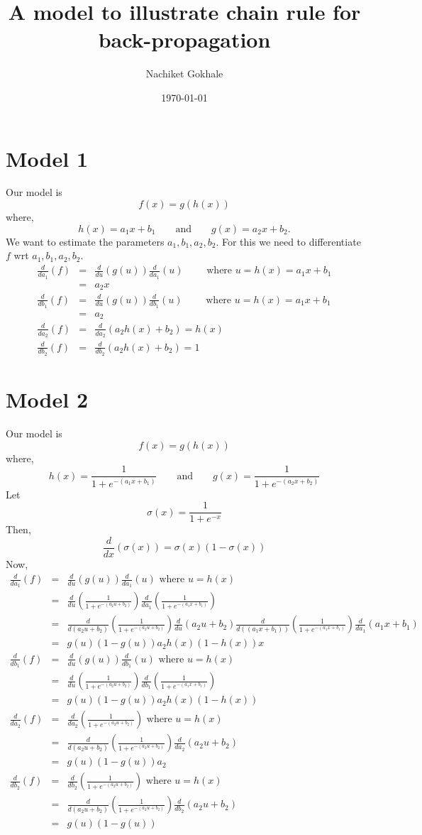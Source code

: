 \documentclass{article}
\newcommand{\beq}{\begin{equation}}
\newcommand{\eeq}{\end{equation}}
\newcommand{\ber}{\begin{eqnarray}}
\newcommand{\eer}{\end{eqnarray}}
\newcommand{\nn}{\nonumber}
\newcommand{\dd}[2]{\frac{d}{d{#2}}{(#1)} }
\begin{document}
\title{A model to illustrate chain rule for back-propagation}
\author{Nachiket Gokhale}
\date{\today}
\maketitle
\section{Model 1}
Our model is 
\beq
f(x) = g(h(x))
\eeq
where,
\beq
h(x) = a_1x + b_1 \qquad \text{and} \qquad g(x) = a_2x+b_2.
\eeq
We want to estimate the parameters $a_1,b_1,a_2,b_2$. For this we need to differentiate $f$ wrt $a_1,b_1,a_2,b_2$.
\ber
\dd{f}{a_1} &=& \dd{g(u)}{u}\dd{u}{a_1} \qquad \text{ where } u = h(x) = a_1x+b_1 \nn \\
            &=& a_2x \\
\dd{f}{b_1} &=& \dd{g(u)}{u}\dd{u}{b_1} \qquad \text{ where } u = h(x) = a_1x+b_1 \nn \\
&=& a_2 \\
\dd{f}{a_2} &=& \dd{a_2h(x) + b_2}{a_2} = h(x) \\
\dd{f}{b_2} &=& \dd{a_2h(x) + b_2}{b_2} = 1
\eer
\section{Model 2}
Our model is 
\beq
f(x) = g(h(x))
\eeq
where,
\beq
h(x) = \frac{1}{1 + e^{-(a_1x+b_1)}} \qquad \text{and} \qquad g(x) = \frac{1}{1 + e^{-(a_2x+b_2)}}
\eeq
Let
\beq
\sigma(x) = \frac{1}{1+e^{-x}}
\eeq
Then,
\beq
\dd{\sigma(x)}{x} = \sigma(x)(1-\sigma(x))
\eeq
Now,
\ber
\dd{f}{a_1} &=& \dd{g(u)}{u}\dd{u}{a_1} \text{ where } u = h(x) \nn \\
            &=& \dd{\frac{1}{1+e^{-(a_2u+b_2)}}}{u}\dd{\frac{1}{1+e^{-(a_1x+b_1)}}}{a_1} \nn \\
&=& \dd{\frac{1}{1+e^{-(a_2u+b_2)}}}{(a_2u+b_2)}\dd{a_2u+b_2}{u}\dd{\frac{1}{1+e^{-(a_1x+b_1)}}}{((a_1x+b_1))}\dd{a_1x+b_1}{a_1} \nn \\
&=& g(u)(1-g(u))a_2h(x)(1-h(x))x \\
%
\dd{f}{b_1} &=& \dd{g(u)}{u}\dd{u}{b_1} \text{ where } u = h(x) \nn \\
&=& \dd{\frac{1}{1+e^{-(a_2u+b_2)}}}{u}\dd{\frac{1}{1+e^{-(a_1x+b_1)}}}{b_1} \nn \\
&=& g(u)(1-g(u))a_2h(x)(1-h(x)) \\
%
\dd{f}{a_2} &=& \dd{\frac{1}{1+e^{-(a_2u+b_2)}}}{a_2} \text{ where } u = h(x) \nn \\
&=& \dd{\frac{1}{1+e^{-(a_2u+b_2)}}}{(a_2u+b_2)}\dd{a_2u+b_2}{a_2} \nn \\
&=& g(u)(1-g(u))a_2 \\
%
\dd{f}{b_2} &=& \dd{\frac{1}{1+e^{-(a_2u+b_2)}}}{b_2} \text{ where } u = h(x) \nn \\
&=& \dd{\frac{1}{1+e^{-(a_2u+b_2)}}}{(a_2u+b_2)}\dd{a_2u+b_2}{b_2} \nn \\
&=& g(u)(1-g(u))
\eer 
\end{document}
